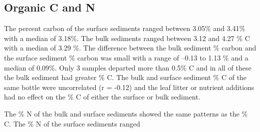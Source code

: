 \subsection{Organic C and N}

The percent carbon of the surface sediments ranged between 3.05\% and 3.41\% with a median of 3.18\%.  The bulk sediments ranged between 3.12 and 4.27 \% C with a median of 3.29 \%.  The difference between the bulk sediment \% carbon and the surface sediment \% carbon was small with a range of --0.13 to 1.13 \% and a median of 0.09\%. Only 3 samples departed more than 0.5\% C and in all of these the bulk sediment had greater \% C. The bulk and surface sediment \% C of the same bottle were uncorrelated (r = -0.12) and the leaf litter or nutrient additions had no effect on the \% C of either the surface or bulk sediment.

The \% N of the bulk and surface sediments showed the same patterns as the \% C.  The \% N of the surface sediments ranged  
